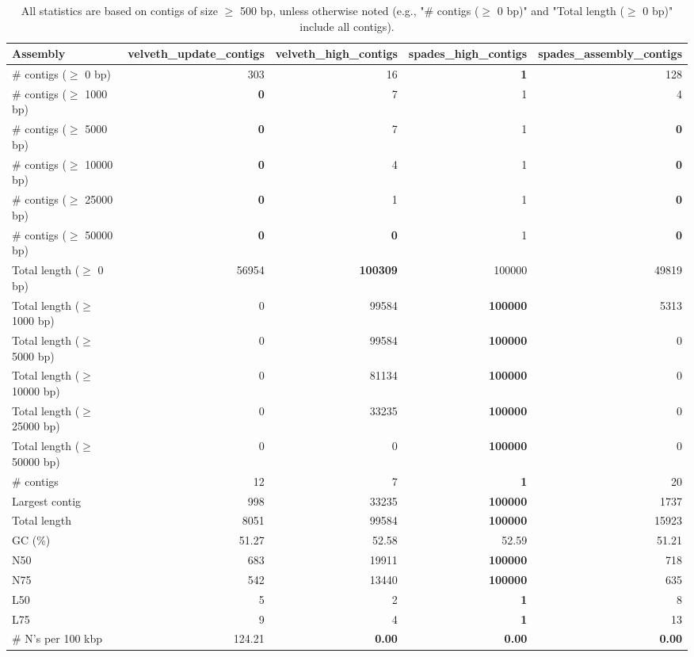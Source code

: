 \documentclass[12pt,a4paper]{article}
\begin{document}
\begin{table}[ht]
\begin{center}
\caption{All statistics are based on contigs of size $\geq$ 500 bp, unless otherwise noted (e.g., "\# contigs ($\geq$ 0 bp)" and "Total length ($\geq$ 0 bp)" include all contigs).}
\begin{tabular}{|l*{4}{|r}|}
\hline
Assembly & velveth\_update\_contigs & velveth\_high\_contigs & spades\_high\_contigs & spades\_assembly\_contigs \\ \hline
\# contigs ($\geq$ 0 bp) & 303 & 16 & {\bf 1} & 128 \\ \hline
\# contigs ($\geq$ 1000 bp) & {\bf 0} & 7 & 1 & 4 \\ \hline
\# contigs ($\geq$ 5000 bp) & {\bf 0} & 7 & 1 & {\bf 0} \\ \hline
\# contigs ($\geq$ 10000 bp) & {\bf 0} & 4 & 1 & {\bf 0} \\ \hline
\# contigs ($\geq$ 25000 bp) & {\bf 0} & 1 & 1 & {\bf 0} \\ \hline
\# contigs ($\geq$ 50000 bp) & {\bf 0} & {\bf 0} & 1 & {\bf 0} \\ \hline
Total length ($\geq$ 0 bp) & 56954 & {\bf 100309} & 100000 & 49819 \\ \hline
Total length ($\geq$ 1000 bp) & 0 & 99584 & {\bf 100000} & 5313 \\ \hline
Total length ($\geq$ 5000 bp) & 0 & 99584 & {\bf 100000} & 0 \\ \hline
Total length ($\geq$ 10000 bp) & 0 & 81134 & {\bf 100000} & 0 \\ \hline
Total length ($\geq$ 25000 bp) & 0 & 33235 & {\bf 100000} & 0 \\ \hline
Total length ($\geq$ 50000 bp) & 0 & 0 & {\bf 100000} & 0 \\ \hline
\# contigs & 12 & 7 & {\bf 1} & 20 \\ \hline
Largest contig & 998 & 33235 & {\bf 100000} & 1737 \\ \hline
Total length & 8051 & 99584 & {\bf 100000} & 15923 \\ \hline
GC (\%) & 51.27 & 52.58 & 52.59 & 51.21 \\ \hline
N50 & 683 & 19911 & {\bf 100000} & 718 \\ \hline
N75 & 542 & 13440 & {\bf 100000} & 635 \\ \hline
L50 & 5 & 2 & {\bf 1} & 8 \\ \hline
L75 & 9 & 4 & {\bf 1} & 13 \\ \hline
\# N's per 100 kbp & 124.21 & {\bf 0.00} & {\bf 0.00} & {\bf 0.00} \\ \hline
\end{tabular}
\end{center}
\end{table}
\end{document}
